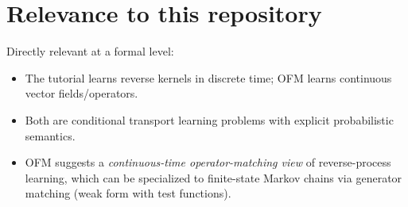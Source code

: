 \documentclass[11pt]{article}
\begin{document}
\section*{Relevance to this repository}
Directly relevant at a formal level:
\begin{itemize}
\item The tutorial learns reverse kernels in discrete time; OFM learns continuous vector fields/operators.
\item Both are conditional transport learning problems with explicit probabilistic semantics.
\item OFM suggests a \emph{continuous-time operator-matching view} of reverse-process learning, which can be specialized to finite-state Markov chains via generator matching (weak form with test functions).
\end{itemize}
\end{document}
